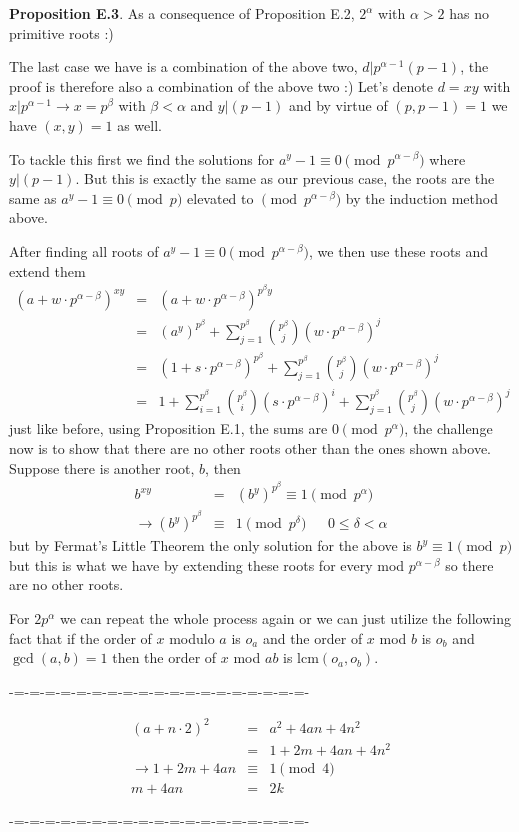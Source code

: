 \documentclass[aps,preprint,preprintnumbers,nofootinbib,showpacs,prd]{revtex4-1}
\newcommand{\nbea}{\begin{eqnarray*}}
\newcommand{\neea}{\end{eqnarray*}}
\begin{document}
{\bf Proposition E.3}. As a consequence of Proposition E.2, $2^\alpha$ with $\alpha > 2$ has no primitive roots :)

The last case we have is a combination of the above two, $d|p^{\alpha-1}(p-1)$, the proof is therefore also a combination of the above two :) Let's denote $d = xy$ with $x|p^{\alpha-1} \to x = p^\beta$ with $\beta < \alpha$ and $y|(p-1)$ and by virtue of $(p,p-1) = 1$ we have $(x,y) = 1$ as well.

To tackle this first we find the solutions for $a^y - 1 \equiv 0 \pmod{p^{\alpha-\beta}}$ where $y|(p-1)$. But this is exactly the same as our previous case, the roots are the same as $a^y-1 \equiv 0 \pmod{p}$ elevated to $\pmod{p^{\alpha-\beta}}$ by the induction method above.

After finding all roots of $a^y - 1 \equiv 0 \pmod{p^{\alpha-\beta}}$, we then use these roots and extend them
%
\nbea
(a + w\cdot p^{\alpha-\beta})^{xy} & = & (a + w\cdot p^{\alpha-\beta})^{p^\beta y} \\
& = & (a^y)^{p^\beta} + \sum_{j=1}^{p^\beta} \binom{p^\beta}{j} (w\cdot p^{\alpha-\beta})^j \\
& = & (1 + s\cdot p^{\alpha-\beta})^{p^\beta} + \sum_{j=1}^{p^\beta} \binom{p^\beta}{j} (w\cdot p^{\alpha-\beta})^j \\
& = & 1 + \sum_{i=1}^{p^\beta} \binom{p^\beta}{i} (s\cdot p^{\alpha-\beta})^i + \sum_{j=1}^{p^\beta} \binom{p^\beta}{j} (w\cdot p^{\alpha-\beta})^j
\neea
%
just like before, using Proposition E.1, the sums are $0 \pmod{p^\alpha}$, the challenge now is to show that there are no other roots other than the ones shown above. Suppose there is another root, $b$, then
%
\nbea
b^{xy} & = & (b^{y})^{p^\beta} \equiv 1 \pmod{p^\alpha} \\
\to (b^{y})^{p^\beta} & \equiv & 1 \pmod{p^\delta} ~~~~~~~ 0 \le \delta < \alpha
\neea
%
but by Fermat's Little Theorem the only solution for the above is $b^y \equiv 1 \pmod{p}$ but this is what we have by extending these roots for every mod $p^{\alpha-\beta}$ so there are no other roots.

For $2p^\alpha$ we can repeat the whole process again or we can just utilize the following fact that if the order of $x$ modulo $a$ is $o_a$ and the order of $x$ mod $b$ is $o_b$ and $\gcd(a,b) = 1$ then the order of $x$ mod $ab$ is lcm$(o_a,o_b)$.




-=-=-=-=-=-=-=-=-=-=-=-=-=-=-=-=-=-=-=-


%
\nbea
(a + n\cdot2)^2 & = & a^2 + 4an + 4n^2 \\
& = & 1 + 2m + 4an + 4n^2 \\
\to 1 + 2m +4an & \equiv & 1 \pmod{4} \\
m + 4an & = & 2k
\neea
%


-=-=-=-=-=-=-=-=-=-=-=-=-=-=-=-=-=-=-=-
\end{document}

